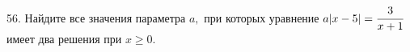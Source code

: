 56. Найдите все значения параметра $a,$ при которых уравнение $a|x-5|=\cfrac{3}{x+1}$ имеет два решения при $x\geqslant 0.$\\
